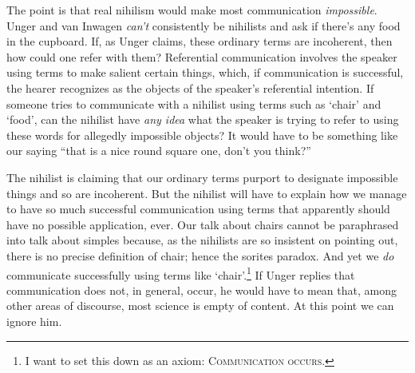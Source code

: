 
The point is that real nihilism would make most communication {\em impossible}. Unger and van Inwagen {\em can't} consistently be nihilists and ask if there's any food in the cupboard. If, as Unger claims, these ordinary terms are incoherent, then how could one refer with them? Referential communication involves the speaker using terms to make salient certain things, which, if communication is successful, the hearer recognizes as the objects of the speaker's referential intention. If someone tries to communicate with a nihilist using terms such as `chair' and `food', can the nihilist have {\em any idea} what the speaker is trying to refer to using these words for allegedly impossible objects? It would have to be something like our saying ``that is a nice round square one, don't you think?''%
%

The nihilist is claiming that our ordinary terms purport to designate impossible things and so are incoherent. But the nihilist will have to explain how we manage to have so much successful communication using terms that apparently should have no possible application, ever. Our talk about chairs cannot be paraphrased into talk about simples because, as the nihilists are so insistent on pointing out, there is no precise definition of chair; hence the sorites paradox. And yet we {\em do} communicate successfully using terms like `chair'.\footnote{I want to set this down as an axiom: \textsc{Communication occurs.}} If Unger replies that communication does not, in general, occur, he would have to mean that, among other areas of discourse, most science is empty of content. At this point we can ignore him.

%
%
%
%
